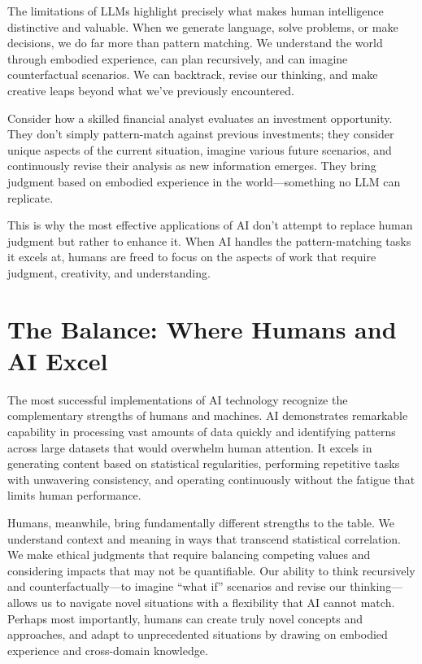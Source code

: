 \documentclass[
  Letterpaper,
]{scrbook}
\begin{document}
The limitations of LLMs highlight precisely what makes human
intelligence distinctive and valuable. When we generate language, solve
problems, or make decisions, we do far more than pattern matching. We
understand the world through embodied experience, can plan recursively,
and can imagine counterfactual scenarios. We can backtrack, revise our
thinking, and make creative leaps beyond what we've previously
encountered.

Consider how a skilled financial analyst evaluates an investment
opportunity. They don't simply pattern-match against previous
investments; they consider unique aspects of the current situation,
imagine various future scenarios, and continuously revise their analysis
as new information emerges. They bring judgment based on embodied
experience in the world---something no LLM can replicate.

This is why the most effective applications of AI don't attempt to
replace human judgment but rather to enhance it. When AI handles the
pattern-matching tasks it excels at, humans are freed to focus on the
aspects of work that require judgment, creativity, and understanding.

\section{The Balance: Where Humans and AI
Excel}\label{the-balance-where-humans-and-ai-excel}

The most successful implementations of AI technology recognize the
complementary strengths of humans and machines. AI demonstrates
remarkable capability in processing vast amounts of data quickly and
identifying patterns across large datasets that would overwhelm human
attention. It excels in generating content based on statistical
regularities, performing repetitive tasks with unwavering consistency,
and operating continuously without the fatigue that limits human
performance.

Humans, meanwhile, bring fundamentally different strengths to the table.
We understand context and meaning in ways that transcend statistical
correlation. We make ethical judgments that require balancing competing
values and considering impacts that may not be quantifiable. Our ability
to think recursively and counterfactually---to imagine ``what if''
scenarios and revise our thinking---allows us to navigate novel
situations with a flexibility that AI cannot match. Perhaps most
importantly, humans can create truly novel concepts and approaches, and
adapt to unprecedented situations by drawing on embodied experience and
cross-domain knowledge.
\end{document}
